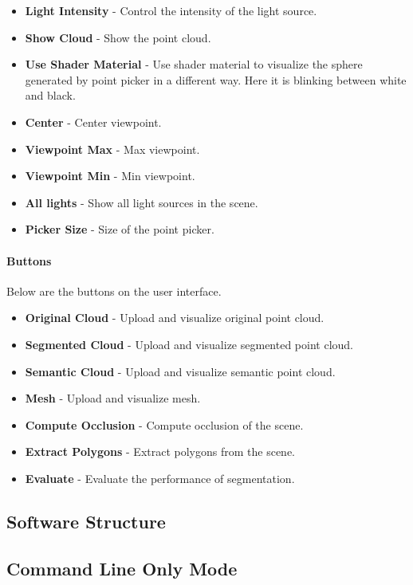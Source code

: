 \documentclass[11pt, a4paper,oneside,chapterprefix=false]{scrbook}
\begin{document}
\begin{itemize}
	\item \textbf{Light Intensity} - Control the intensity of the light source.
	\item \textbf{Show Cloud} - Show the point cloud.
	\item \textbf{Use Shader Material} - Use shader material to visualize the sphere generated by point picker in a different way. Here it is blinking between white and black.
	\item \textbf{Center} - Center viewpoint.
	\item \textbf{Viewpoint Max} - Max viewpoint.
	\item \textbf{Viewpoint Min} - Min viewpoint.
	\item \textbf{All lights} - Show all light sources in the scene.
	\item \textbf{Picker Size} - Size of the point picker.
\end{itemize}

\paragraph{Buttons}

Below are the buttons on the user interface.

\begin{itemize}
	\item \textbf{Original Cloud} - Upload and visualize original point cloud.
	\item \textbf{Segmented Cloud} - Upload and visualize segmented point cloud.
	\item \textbf{Semantic Cloud} - Upload and visualize semantic point cloud.
	\item \textbf{Mesh} - Upload and visualize mesh.
	\item \textbf{Compute Occlusion} - Compute occlusion of the scene.
	\item \textbf{Extract Polygons} - Extract polygons from the scene.
	\item \textbf{Evaluate} - Evaluate the performance of segmentation.
\end{itemize}

\subsection{Software Structure}


\subsection{Command Line Only Mode}
\end{document}
